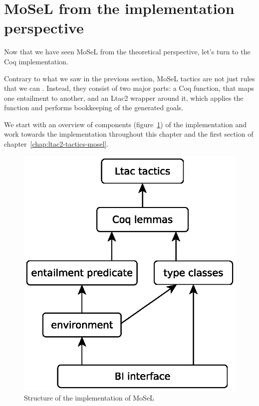 \section{MoSeL from the implementation perspective}
\label{sec:implementation-of-ipm}

Now that we have seen MoSeL from the theoretical perspective, let's turn to the Coq implementation.

Contrary to what we saw in the previous section, MoSeL tactics are not just rules that we can .
Instead, they consist of two major parts: a Coq function, that maps one entailment to another, and an Ltac2 wrapper around it, which applies the function and performs bookkeeping of the generated goals.

We start with an overview of components (figure~\ref{fig:ipm-diagram}) of the implementation and work towards the implementation  throughout this chapter and the first section of chapter~\ref{chap:ltac2-tactics-mosel}.

\begin{figure}
  \centering
  \includegraphics[width=0.5\linewidth]{ipm-diagram}
  \caption{Structure of the implementation of MoSeL}
  \label{fig:ipm-diagram}
\end{figure}

